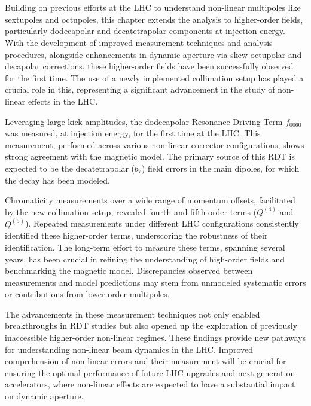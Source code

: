 \section{}


Building on previous efforts at the LHC to understand non-linear multipoles like
sextupoles and octupoles, this chapter extends the analysis to higher-order fields, particularly
dodecapolar and decatetrapolar components at injection energy. With the development of improved
measurement techniques and analysis procedures, alongside enhancements in dynamic aperture via skew
octupolar and decapolar corrections, these higher-order fields have been successfully observed for
the first time. The use of a newly implemented collimation setup has played a crucial role in this,
representing a significant advancement in the study of non-linear effects in the LHC.

Leveraging large kick amplitudes, the dodecapolar Resonance Driving Term $f_{0060}$ was measured, at
injection energy, for the first time at the LHC. This measurement, performed across various
non-linear corrector configurations, shows strong agreement with the magnetic model. The primary
source of this RDT is expected to be the decatetrapolar ($b_7$) field errors in the main dipoles,
for which the decay has been modeled.

Chromaticity measurements over a wide range of momentum offsets, facilitated by the new collimation
setup, revealed fourth and fifth order terms ($Q^{(4)}$ and $Q^{(5)}$). Repeated measurements
under different LHC configurations consistently identified these higher-order terms, underscoring
the robustness of their identification. The long-term effort to measure these terms, spanning
several years, has been crucial in refining the understanding of high-order fields and
benchmarking the magnetic model. Discrepancies observed between measurements and model predictions
may stem from unmodeled systematic errors or contributions from lower-order multipoles.

The advancements in these measurement techniques not only enabled breakthroughs in RDT studies but
also opened up the exploration of previously inaccessible higher-order non-linear regimes. These
findings provide new pathways for understanding non-linear beam dynamics in the LHC. Improved
comprehension of non-linear errors and their measurement will be crucial for ensuring the optimal
performance of future LHC upgrades and next-generation accelerators, where non-linear effects are
expected to have a substantial impact on dynamic aperture.